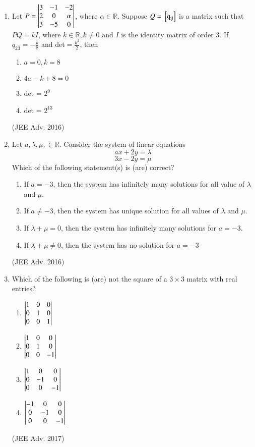 \documentclass[journal,12pt,twocolumn]{IEEEtran}
\theoremstyle{remark}
\begin{document}
\begin{enumerate}
				\item 
					Let $P = 
						\begin{vmatrix}		
							3 & -1 & -2\\
							2 & 0 & \alpha\\
							3 & -5 & 0
						\end{vmatrix}$,
					where $\alpha \in \mathbb{R}$. Suppose $Q= \mathrm{{}\left[q_{ij}\right]}$ is a matrix such that $PQ=kI$, where $k \in \mathbb{R}, k \neq 0$ and $I$ is the identity matrix of order $3$. If $q_{23} = -\frac{k}{8}$ and det$= \frac{k^2}{2}$, then
					\begin{enumerate}
						\item $a=0, k=8$
						\item $4a-k+8=0$
						\item det  = $2^9$
						\item det  = $2^{13}$
					\end{enumerate}
					\hfill (JEE Adv. 2016)
				\item
					Let $a, \lambda, \mu, \in \mathbb{R}$. Consider the system of linear equations $$ax+2y=\lambda$$ $$3x-2y=\mu$$ Which of the following statement(s) is (are) correct?
					\begin{enumerate}
						\item If $a=-3$, then the system has infinitely many solutions for all value of $\lambda$ and $\mu$.
						\item If $a \neq -3$, then the system has unique solution for all values of $\lambda$ and $\mu$.
						\item If $\lambda + \mu = 0$, then the system has infinitely many solutions for $a = -3$.
						\item If $\lambda + \mu \neq 0$, then the system has no solution for $a = -3$
					\end{enumerate}
					\hfill (JEE Adv. 2016)\\
				\item 
					Which of the following is (are) not the square of a $3 \times 3$ matrix with real entries?
						\begin{enumerate}
							\item 
								$\begin{vmatrix}
									1&0&0\\
									0&1&0\\
									0&0&1
								\end{vmatrix}$\\
							\item 
								$\begin{vmatrix}
									1&0&0\\
									0&1&0\\
									0&0&-1
								\end{vmatrix}$\\
							\item 
								$\begin{vmatrix}
									1&0&0\\
									0&-1&0\\
									0&0&-1
								\end{vmatrix}$\\
							\item 
								$\begin{vmatrix}
									-1&0&0\\
									0&-1&0\\
									0&0&-1
								\end{vmatrix}$\\
						\end{enumerate}
						\hfill (JEE Adv. 2017)\\	
			\end{enumerate}
		
	
\end{document}
